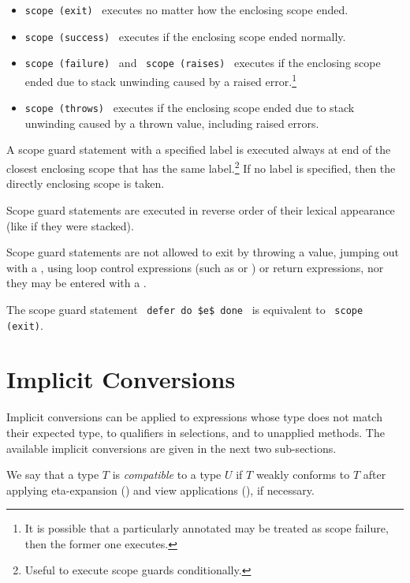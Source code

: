 \begin{itemize}
  \item \lstinline!scope (exit)!~ executes no matter how the enclosing scope ended. 
  \item \lstinline!scope (success)!~ executes if the enclosing scope ended normally. 
  \item \lstinline!scope (failure)!~ and ~\lstinline!scope (raises)!~ executes if the enclosing scope ended due to stack unwinding caused by a raised error.\footnote{It is possible that a particularly annotated  may be treated as scope failure, then the former one executes.}
  \item \lstinline!scope (throws)!~ executes if the enclosing scope ended due to stack unwinding caused by a thrown value, including raised errors.
\end{itemize}

A scope guard statement with a specified label is executed always at end of the closest enclosing scope that has the same label.\footnote{Useful to execute scope guards conditionally.} If no label is specified, then the directly enclosing scope is taken. 

Scope guard statements are executed in reverse order of their lexical appearance (like if they were stacked). 

Scope guard statements are not allowed to exit by throwing a value, jumping out with a , using loop control expressions (such as  or ) or return expressions, nor they may be entered with a .

The scope guard statement ~\lstinline!defer do $e$ done!~ is equivalent to ~\lstinline!scope (exit)!.





\section{Implicit Conversions}
\label{sec:implicit-conversions}

Implicit conversions can be applied to expressions whose type does not match their expected type, to qualifiers in selections, and to unapplied methods. The available implicit conversions are given in the next two sub-sections.

We say that a type $T$ is {\em compatible} to a type $U$ if $T$ weakly conforms to $T$ after applying eta-expansion () and view applications (), if necessary.







